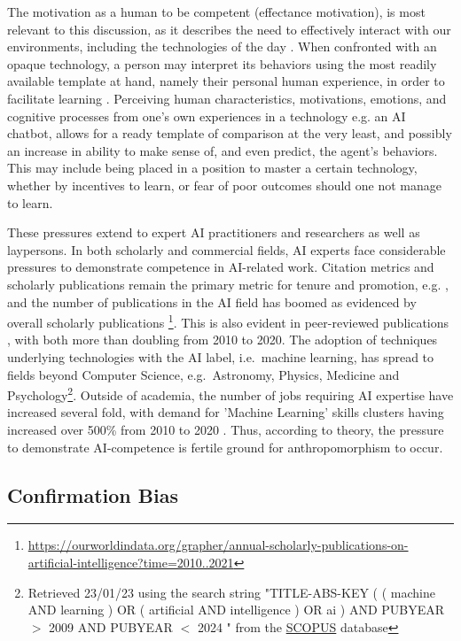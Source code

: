 \documentclass{article}
\theoremstyle{plain}
\theoremstyle{definition}
\theoremstyle{remark}
\begin{document}
The motivation as a human to be competent (effectance motivation), is most relevant to this discussion, as it describes the need to effectively interact with our environments, including the technologies of the day \cite{epley2007seeing}. When confronted with an opaque technology, a person may interpret its behaviors using the most readily available template at hand, namely their personal human experience, in order to facilitate learning \cite{epley2007seeing, waytz2010social}. Perceiving human characteristics, motivations, emotions, and cognitive processes from one's own experiences in a technology e.g. an AI chatbot, allows for a ready template of comparison at the very least, and possibly an increase in ability to make sense of, and even predict, the agent's behaviors. This may include being placed in a position to master a certain technology, whether by incentives to learn, or fear of poor outcomes should one not manage to learn. 

These pressures extend to expert AI practitioners and researchers as well as laypersons. In both scholarly and commercial fields, AI experts face considerable pressures to demonstrate competence in AI-related work. Citation metrics and scholarly publications remain the primary metric for tenure and promotion, e.g. \cite{alperin2019significant}, and the number of publications in the AI field has boomed as evidenced by overall scholarly publications \footnote{\url{https://ourworldindata.org/grapher/annual-scholarly-publications-on-artificial-intelligence?time=2010..2021} }. This is also evident in peer-reviewed publications \cite{Maslej2023-pi}, with both more than doubling from 2010 to 2020. The adoption of techniques underlying technologies with the AI label, i.e.\ machine learning, has spread to fields beyond Computer Science, e.g.\ Astronomy, Physics, Medicine and Psychology\footnote{Retrieved 23/01/23 using the search string "TITLE-ABS-KEY ( ( machine  AND  learning )  OR  ( artificial  AND  intelligence )  OR  ai )  AND  PUBYEAR  $>$  2009  AND  PUBYEAR  $<$  2024 " from the \href{https://www.scopus.com/}{SCOPUS} database}. Outside of academia, the number of jobs requiring AI expertise have increased several fold, with demand for 'Machine Learning' skills clusters having increased over 500\% from 2010 to 2020 \cite{Maslej2023-pi}. Thus, according to theory, the pressure to demonstrate AI-competence is fertile ground for anthropomorphism to occur. 


\subsection{Confirmation Bias}
\end{document}
